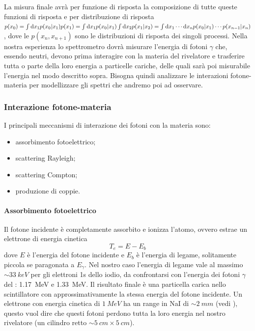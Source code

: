 La misura finale avrà per funzione di risposta la composizione di tutte queste funzioni di risposta e per distribuzione di risposta  $p(x_0)=\int\mathrm{d} x_1 p(x_0|x_1) p(x_1)
=\int \mathrm{d} x_1 p(x_0|x_1) \int \mathrm{d} x_2 p(x_1|x_2)
=\int \mathrm{d} x_1 \dotsm \mathrm{d} x_n p(x_0|x_1)\dotsm p(x_{n-1}|x_n)$, dove le $p(x_n,x_{n+1})$ sono le distribuzioni di risposta dei singoli processi.
Nella nostra esperienza lo spettrometro dovrà misurare l'energia di fotoni $\gamma$ che, essendo neutri, devono prima interagire con la materia del rivelatore e trasferire tutta o parte della loro energia a particelle cariche, delle quali sarà poi misurabile l'energia nel modo descritto sopra. Bisogna quindi analizzare le interazioni fotone-materia per modellizzare gli spettri che andremo poi ad osservare.


\subsubsection{Interazione fotone-materia}
I principali meccanismi di interazione dei fotoni con la materia sono:
\begin{itemize}
	\item assorbimento fotoelettrico;
	\item scattering Rayleigh;
	\item scattering Compton;
	\item produzione di coppie.
\end{itemize}
  
 \paragraph{Assorbimento fotoelettrico}
 Il fotone incidente è completamente assorbito e ionizza l'atomo, ovvero estrae un elettrone di energia cinetica 
 \begin{equation} \label{eq:fotoelettrico}
 T_e = E - E_b
 \end{equation} 
 dove $E$ è l'energia del fotone incidente e $E_b$ è l'energia di legame, solitamente piccola se paragonata a $E_{\gamma}$. Nel nostro caso l'energia di legame vale al massimo $\sim \SI{33}{keV}$ per gli elettroni 1s dello iodio, da confrontarsi con l'energia dei fotoni $\gamma$ del \co\;: \SI{1.17}{MeV} e \SI{1.33}{MeV}. Il risultato finale è una particella carica nello scintillatore con approssimativamente la stessa energia del fotone incidente.
 Un elettrone con energia cinetica di $\SI{1}{MeV}$ ha un range in NaI di $\sim \SI{2}{mm}$ (vedi \cite{3}), questo vuol dire che questi fotoni perdono tutta la loro energia nel nostro rivelatore (un cilindro retto $\sim \SI{5}{cm} \times \SI{5}{cm}$). 

